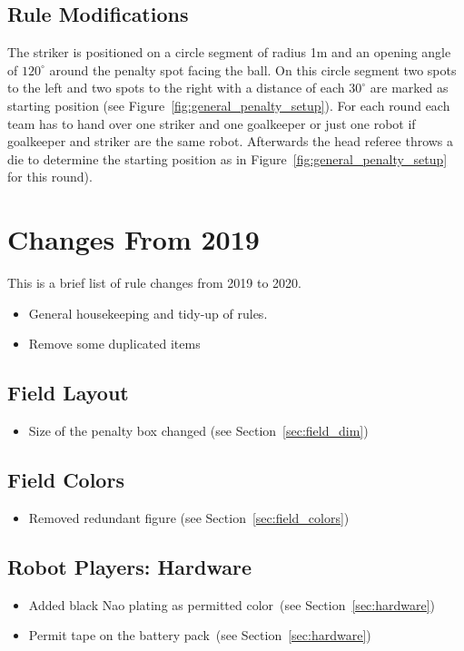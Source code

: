 \documentclass[12pt]{article}
\newcommand{\cf}{see\xspace}
\begin{document}
\subsection{Rule Modifications}
The striker is positioned on a circle segment of radius 1m and an opening angle of $120^\circ$ around the penalty spot facing the ball. On this circle segment two spots to the left and two spots to the right with a distance of each $30^\circ$ are marked as starting position (see Figure~\ref{fig:general_penalty_setup}). For each round each team has to hand over one striker and one goalkeeper or just one robot if goalkeeper and striker are the same robot. Afterwards the head referee throws a die to determine the starting position as in Figure~\ref{fig:general_penalty_setup} for this round).

\newpage
\section{Changes From 2019}
This is a brief list of rule changes from 2019 to 2020.

\begin{itemize}
  \item General housekeeping and tidy-up of rules.
  \item Remove some duplicated items
\end{itemize}

\subsection*{Field Layout}
\begin{itemize}
  \item Size of the penalty box changed (\cf Section~\ref{sec:field_dim})
\end{itemize}

\subsection*{Field Colors}
\begin{itemize}
  \item Removed redundant figure (\cf Section~\ref{sec:field_colors})
\end{itemize}

\subsection*{Robot Players: Hardware}
\begin{itemize}
  \item Added black Nao plating as permitted color~(\cf Section~\ref{sec:hardware})
  \item Permit tape on the battery pack~(\cf Section~\ref{sec:hardware})
\end{itemize}
\end{document}

